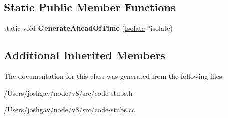 \subsection*{Static Public Member Functions}
\begin{DoxyCompactItemize}
\item 
static void {\bfseries Generate\+Ahead\+Of\+Time} (\hyperlink{classv8_1_1internal_1_1_isolate}{Isolate} $\ast$isolate)\hypertarget{classv8_1_1internal_1_1_create_allocation_site_stub_a4bcfe6fa5638dbcabd3309abe7e7a8d4}{}\label{classv8_1_1internal_1_1_create_allocation_site_stub_a4bcfe6fa5638dbcabd3309abe7e7a8d4}

\end{DoxyCompactItemize}
\subsection*{Additional Inherited Members}


The documentation for this class was generated from the following files\+:\begin{DoxyCompactItemize}
\item 
/\+Users/joshgav/node/v8/src/code-\/stubs.\+h\item 
/\+Users/joshgav/node/v8/src/code-\/stubs.\+cc\end{DoxyCompactItemize}
